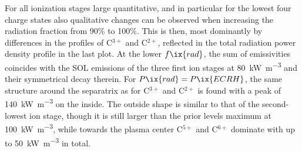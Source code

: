         For all ionization stages large quantitative, and in particular for the lowest four charge states also qualitative changes can be observed when increasing the radiation fraction from 90\% to 100\%. This is then, most dominantly by differences in the profiles of C$^{3+}$ and C$^{2+}$, reflected in the total radiation power density profile in the last plot. At the lower $f\ix{rad}$, the sum of emissivities coincides with the SOL emissions of the three first ion stages at \SI{80}{\kilo\watt\per\cubic\meter} and their symmetrical decay therein. For $P\ix{rad}=P\ix{ECRH}$, the same structure around the separatrix as for C$^{3+}$ and C$^{2+}$ is found with a peak of \SI{140}{\kilo\watt\per\cubic\meter} on the inside. The outside shape is similar to that of the second-lowest ion stage, though it is still larger than the prior levels maximum at \SI{100}{\kilo\watt\per\cubic\meter}, while towards the plasma center C$^{5+}$ and C$^{6+}$ dominate with up to \SI{50}{\kilo\watt\per\cubic\meter} in total.\\%
%
        \newline%
